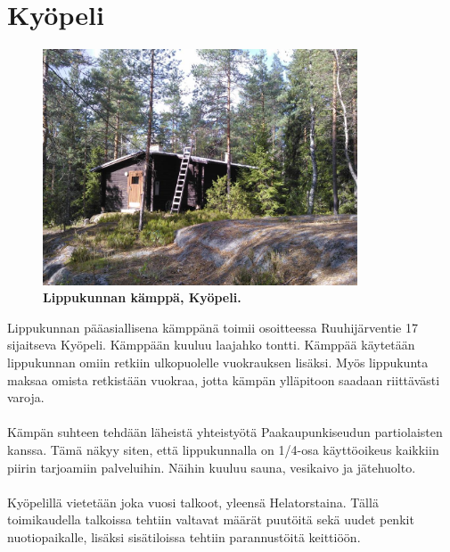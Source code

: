 \documentclass[a4paper, 12pt, finnish]{report} %
\begin{document}
\section{Kyöpeli}
\begin{figure}[htb]
	\begin{center}
		\includegraphics[height=7cm]{kyopeli.jpg}
	\end{center}
	\captionsetup{labelformat=empty}
	\caption{\textbf{Lippukunnan kämppä, Kyöpeli.}}
\end{figure}

Lippukunnan pääasiallisena kämppänä toimii osoitteessa Ruuhijärventie 17 sijaitseva Kyöpeli. Kämppään kuuluu laajahko tontti. Kämppää käytetään lippukunnan omiin retkiin ulkopuolelle vuokrauksen lisäksi. Myös lippukunta maksaa omista retkistään vuokraa, jotta kämpän ylläpitoon saadaan riittävästi varoja.\\
\\Kämpän suhteen tehdään läheistä yhteistyötä Paakaupunkiseudun partiolaisten kanssa. Tämä näkyy siten, että lippukunnalla on 1/4-osa käyttöoikeus kaikkiin piirin tarjoamiin palveluihin. Näihin kuuluu sauna, vesikaivo ja jätehuolto.\\
\\Kyöpelillä vietetään joka vuosi talkoot, yleensä Helatorstaina. Tällä toimikaudella talkoissa tehtiin valtavat määrät puutöitä sekä uudet penkit nuotiopaikalle, lisäksi sisätiloissa tehtiin parannustöitä keittiöön.
\newpage
\end{document}

